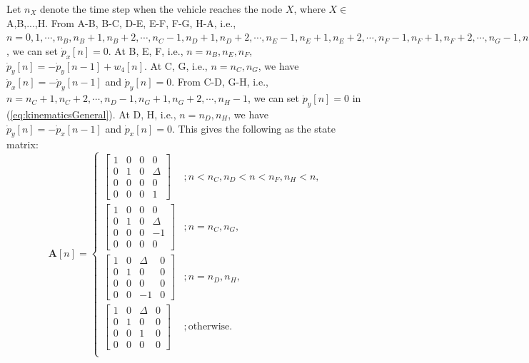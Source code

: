 \documentclass[11pt]{article}
\newcommand{\bA}{\mathbf{A}}
\begin{document}
Let $n_{X}$ denote the time step when the vehicle reaches the node $X$, where $X\in$ A,B,...,H. From A-B, B-C, D-E, E-F, F-G, H-A, i.e., $n=0,1,\cdots,n_{B}, n_{B}+1,n_{B}+2,\cdots,n_{C}-1, n_{D}+1,n_{D}+2,\cdots,n_{E}-1, n_{E}+1,n_{E}+2,\cdots,n_{F}-1, n_{F}+1,n_{F}+2,\cdots,n_{G}-1, n_{H}+1,n_{H}+2,\cdots,N-1$, we can set $\dot{p}_{x}[n] = 0$. At B, E, F, i.e., $n=n_{B}, n_{E}, n_{F}$, $\dot{p}_{y}[n] = -\dot{p}_{y}[n-1] + w_{4}[n]$. At C, G, i.e., $n=n_{C},n_{G}$, we have $\dot{p}_{x}[n] = -\dot{p}_{y}[n-1]$ and $\dot{p}_{y}[n] = 0$. From C-D, G-H, i.e., $n=n_{C}+1,n_{C}+2,\cdots,n_{D}-1, n_{G}+1,n_{G}+2,\cdots,n_{H}-1$, we can set $\dot{p}_{y}[n] = 0$ in (\ref{eq:kinematicsGeneral}). At D, H, i.e., $n=n_{D}, n_{H}$, we have $\dot{p}_{y}[n] = -\dot{p}_{x}[n-1]$ and $\dot{p}_{x}[n]=0$. This gives the following as the state matrix:
\begin{equation}
	\bA[n] = \begin{cases}
		\begin{bmatrix}
			1 & 0 & 0 & 0 \\
			0 & 1 & 0 & \Delta \\
			0 & 0 & 0 & 0 \\
			0 & 0 & 0 & 1
		\end{bmatrix} & ;n<n_{C}, n_{D}<n<n_{F}, n_{H}<n, \\
		\begin{bmatrix}
			1 & 0 & 0 & 0 \\
			0 & 1 & 0 & \Delta \\
			0 & 0 & 0 & -1 \\
			0 & 0 & 0 & 0
		\end{bmatrix} & ;n=n_{C},n_{G}, \\
		\begin{bmatrix}
			1 & 0 & \Delta & 0 \\
			0 & 1 & 0 & 0 \\
			0 & 0 & 0 & 0 \\
			0 & 0 & -1 & 0
		\end{bmatrix} & ;n=n_{D},n_{H}, \\
		\begin{bmatrix}
			1 & 0 & \Delta & 0 \\
			0 & 1 & 0 & 0 \\
			0 & 0 & 1 & 0 \\
			0 & 0 & 0 & 0
		\end{bmatrix} & ;\text{otherwise}. \\
	\end{cases}
\end{equation}
\end{document}
